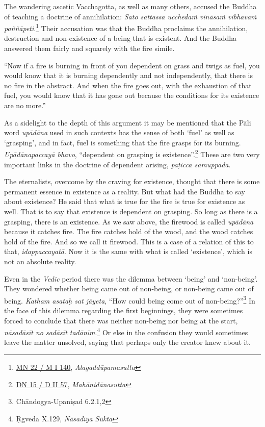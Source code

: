 The wandering ascetic Vacchagotta, as well as many others, accused the Buddha of teaching a doctrine of annihilation: \emph{Sato sattassa ucchedaṁ vināsaṁ vibhavaṁ paññāpeti}.\footnote{\href{https://suttacentral.net/mn22/pli/ms}{MN 22 / M I 140}, \emph{Alagaddūpamasutta}} Their accusation was that the Buddha proclaims the annihilation, destruction and non-existence of a being that is existent. And the Buddha answered them fairly and squarely with the fire simile.

``Now if a fire is burning in front of you dependent on grass and twigs as fuel, you would know that it is burning dependently and not independently, that there is no fire in the abstract. And when the fire goes out, with the exhaustion of that fuel, you would know that it has gone out because the conditions for its existence are no more.''

As a sidelight to the depth of this argument it may be mentioned that the Pāli word \emph{upādāna} used in such contexts has the sense of both `fuel' as well as `grasping', and in fact, fuel is something that the fire grasps for its burning. \emph{Upādānapaccayā bhavo}, ``dependent on grasping is existence''.\footnote{\href{https://suttacentral.net/dn15/pli/ms}{DN 15 / D II 57}, \emph{Mahānidānasutta}} These are two very important links in the doctrine of dependent arising, \emph{paṭicca samuppāda}.

The eternalists, overcome by the craving for existence, thought that there is some permanent essence in existence as a reality. But what had the Buddha to say about existence? He said that what is true for the fire is true for existence as well. That is to say that existence is dependent on grasping. So long as there is a grasping, there is an existence. As we saw above, the firewood is called \emph{upādāna} because it catches fire. The fire catches hold of the wood, and the wood catches hold of the fire. And so we call it firewood. This is a case of a relation of this to that, \emph{idappaccayatā}. Now it is the same with what is called `existence', which is not an absolute reality.

Even in the \emph{Vedic} period there was the dilemma between `being' and `non-being'. They wondered whether being came out of non-being, or non-being came out of being. \emph{Katham asataḥ sat jāyeta}, ``How could being come out of non-being?''\footnote{Chāndogya-Upaniṣad 6.2.1,2} In the face of this dilemma regarding the first beginnings, they were sometimes forced to conclude that there was neither non-being nor being at the start, \emph{nāsadāsīt no sadāsīt tadānīm}.\footnote{Ṛgveda X.129, \emph{Nāsadīya Sūkta}} Or else in the confusion they would sometimes leave the matter unsolved, saying that perhaps only the creator knew about it.

